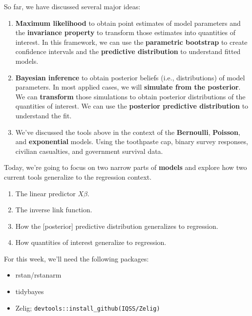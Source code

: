 \documentclass[
]{book}
\providecommand{\tightlist}{%
  \setlength{\itemsep}{0pt}\setlength{\parskip}{0pt}}
\begin{document}
So far, we have discussed several major ideas:

\begin{enumerate}
\def\labelenumi{\arabic{enumi}.}
\tightlist
\item
  \textbf{Maximum likelihood} to obtain point estimates of model
  parameters and the \textbf{invariance property} to transform those
  estimates into quantities of interest. In this framework, we can use
  the \textbf{parametric bootstrap} to create confidence intervals and
  the \textbf{predictive distribution} to understand fitted models.
\item
  \textbf{Bayesian inference} to obtain posterior beliefs (i.e.,
  distributions) of model parameters. In most applied cases, we will
  \textbf{simulate from the posterior}. We can \textbf{transform} those
  simulations to obtain posterior distributions of the quantities of
  interest. We can use the \textbf{posterior predictive distribution} to
  understand the fit.
\item
  We've discussed the tools above in the context of the
  \textbf{Bernoulli}, \textbf{Poisson}, and \textbf{exponential} models.
  Using the toothpaste cap, binary survey responses, civilian
  casualties, and government survival data.
\end{enumerate}

Today, we're going to focus on two narrow parts of \textbf{models} and
explore how two current tools generalize to the regression context.

\begin{enumerate}
\def\labelenumi{\arabic{enumi}.}
\tightlist
\item
  The linear predictor \(X\beta\).
\item
  The inverse link function.
\item
  How the {[}posterior{]} predictive distribution generalizes to
  regression.
\item
  How quantities of interest generalize to regression.
\end{enumerate}

For this week, we'll need the following packages:

\begin{itemize}
\tightlist
\item
  rstan/rstanarm
\item
  tidybayes
\item
  Zelig;
  \texttt{devtools::install\_github(\textquotesingle{}IQSS/Zelig\textquotesingle{})}
\end{itemize}
\end{document}
